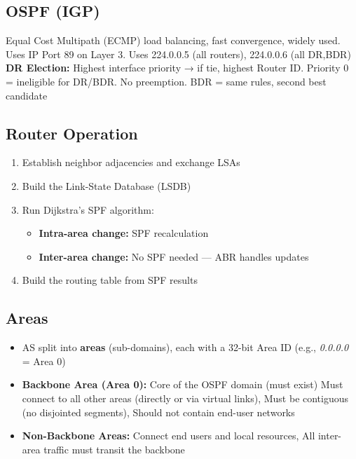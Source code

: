 

\newcommand{\SUBJECT}{}
\newcommand{\TITLE}{Cheat Sheet Computernetze 2}


	
	
	\begin{multicols*}{5}
		\setlength{\columnseprule}{0.4pt}
		\footnotesize
		
		
		\section{OSPF (IGP)}
		Equal Cost Multipath (ECMP) load balancing, fast convergence, widely used. Uses IP Port 89 on Layer 3. Uses 224.0.0.5 (all routers), 224.0.0.6 (all DR,BDR) \\
		\textbf{DR Election:} Highest interface priority → if tie, highest Router ID. Priority 0 = ineligible for DR/BDR. No preemption. BDR = same rules, second best candidate
		\subsection{Router Operation}
		\begin{enumerate}
			\item Establish neighbor adjacencies and exchange LSAs
			\item Build the Link-State Database (LSDB)
			\item Run Dijkstra's SPF algorithm:
			\begin{itemize}
				\item \textbf{Intra-area change:} SPF recalculation
				\item \textbf{Inter-area change:} No SPF needed — ABR handles updates
			\end{itemize}
			\item Build the routing table from SPF results
		\end{enumerate}
		\subsection{Areas}
		\begin{itemize}
			\item AS split into \textbf{areas} (sub-domains), each with a 32-bit Area ID (e.g., \textit{0.0.0.0} = Area 0)
			\item \textbf{Backbone Area (Area 0):} Core of the OSPF domain (must exist) Must connect to all other areas (directly or via virtual links), Must be contiguous (no disjointed segments), Should not contain end-user networks
			\item \textbf{Non-Backbone Areas:} Connect end users and local resources, All inter-area traffic must transit the backbone
		\end{itemize}

\end{multicols*}
